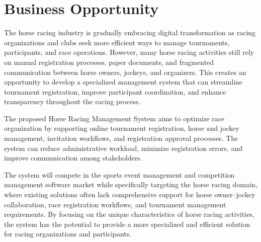 \section{Business Opportunity}

The horse racing industry is gradually embracing digital transformation as racing organizations and clubs seek more efficient ways to manage tournaments, participants, and race operations. However, many horse racing activities still rely on manual registration processes, paper documents, and fragmented communication between horse owners, jockeys, and organizers. This creates an opportunity to develop a specialized management system that can streamline tournament registration, improve participant coordination, and enhance transparency throughout the racing process.

The proposed Horse Racing Management System aims to optimize race organization by supporting online tournament registration, horse and jockey management, invitation workflows, and registration approval processes. The system can reduce administrative workload, minimize registration errors, and improve communication among stakeholders.

The system will compete in the sports event management and competition management software market while specifically targeting the horse racing domain, where existing solutions often lack comprehensive support for horse owner–jockey collaboration, race registration workflows, and tournament management requirements. By focusing on the unique characteristics of horse racing activities, the system has the potential to provide a more specialized and efficient solution for racing organizations and participants.
